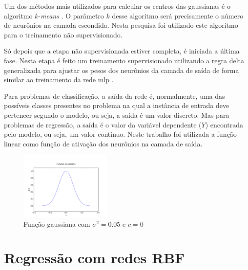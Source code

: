 \documentclass[conference]{IEEEtran}
\begin{document}
Um dos métodos mais utilizados para calcular os centros das gaussianas é o 
algoritmo $k$-\textit{means} \cite{daredes}. O parâmetro $k$ desse algoritmo 
será precisamente o número de neurônios na camada escondida. Nesta pesquisa 
foi utilizado este algoritmo para o treinamento não supervisionado.

Só depois que a etapa não supervisionada estiver completa, é iniciada a última 
fase. Nesta etapa é feito um treinamento supervisionado utilizando a regra delta 
generalizada para ajustar os pesos dos neurônios da camada de saída de forma 
similar ao treinamento da rede \ac*{mlp} \cite{daredes}.

Para problemas de classificação, a saída da rede é, normalmente, uma das 
possíveis classes presentes no problema na qual a instância de entrada deve 
pertencer segundo o modelo, ou seja, a saída é um valor discreto. Mas para 
problemas de regressão, a saída é o valor da variável dependente ($Y$) 
encontrada pelo modelo, ou seja, um valor contínuo. Neste trabalho foi 
utilizada a função linear como função de ativação dos neurônios na camada de 
saída.

\begin{figure}[t]
	\caption{Função gaussiana com $\sigma^{2} = 0.05$ e $c = 0$}
	\label{fig:gaussian}
	\centering
	\includegraphics[width=0.40\textwidth]{gaussian}
\end{figure}

\section{Regressão com redes RBF}
\label{resultados}
\end{document}
